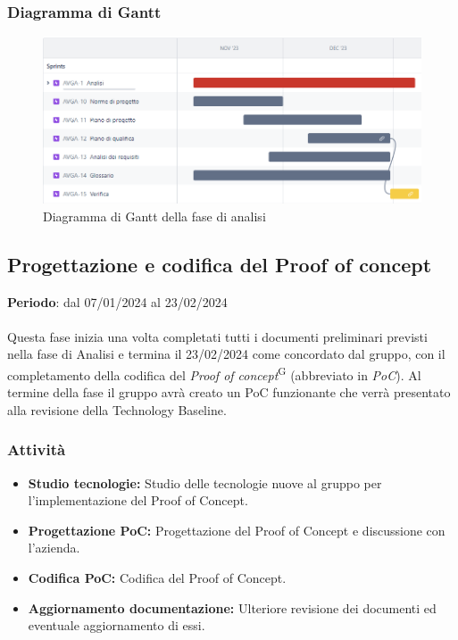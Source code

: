 \newpage 
\subsubsection{Diagramma di Gantt}\label{sec:pianificazione:analisi:gantt}

\begin{figure}[H]
    \centering
    \includegraphics[width=1\textwidth]{images/gantt_analisi.PNG}
    \caption{Diagramma di Gantt della fase di analisi}
    \label{fig:gantt_analisi}
\end{figure}


\subsection{Progettazione e codifica del Proof of concept}\label{sec:pianificazione:progRTB}

\textbf{Periodo}: dal 07/01/2024 al 23/02/2024\\\\
Questa fase inizia una volta completati tutti i documenti preliminari previsti nella fase di Analisi e termina il 23/02/2024 come concordato dal gruppo, con il completamento della codifica del \textit{Proof of concept}\textsuperscript{G} (abbreviato in \textit{PoC}). Al termine della fase il gruppo avrà creato un PoC funzionante che verrà presentato alla revisione della Technology Baseline.

\subsubsection{Attività}\label{sec:pianificazione:progRTB:attivita}
\begin{itemize}
    \item \textbf{Studio tecnologie:} Studio delle tecnologie nuove al gruppo per l'implementazione del Proof of Concept.
    \item \textbf{Progettazione PoC:} Progettazione del Proof of Concept e discussione con l'azienda.
    \item \textbf{Codifica PoC:} Codifica del Proof of Concept.
    \item \textbf{Aggiornamento documentazione:} Ulteriore revisione dei documenti ed eventuale aggiornamento di essi.
\end{itemize}

